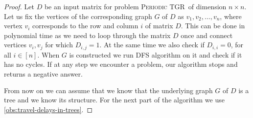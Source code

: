 \documentclass[a4paper,UKenglish,cleveref, autoref, thm-restate, anonymous]{lipics-v2021}
\newcommand{\deltaExact}{\textsc{Periodic TGR}}
\begin{document}
\begin{proof}
    Let $D$ be an input matrix for problem \deltaExact\ of dimension $n \times n$.
    Let us fix the vertices of the corresponding graph $G$ of $D$ as $v_1, v_2, \dots, v_n$, where vertex $v_i$ corresponds to the row and column $i$ of matrix $D$.
    This can be done in polynomial time as we need to loop through the matrix $D$ once and connect vertices $v_i, v_j$ for which $D_{i,j} = 1$. At the same time we also check if $D_{i,i} = 0$, for all $i \in [n]$.
    When $G$ is constructed we run DFS algorithm on it and check if it has no cycles.
    If at any step we encounter a problem, our algorithm stops and returns a negative answer.
    
    From now on we can assume that we know that the underlying graph $G$ of $D$ is a tree and we know its structure.
    For the next part of the algorithm we use \cref{obs:travel-delays-in-trees}.
    

\end{proof}
\end{document}
